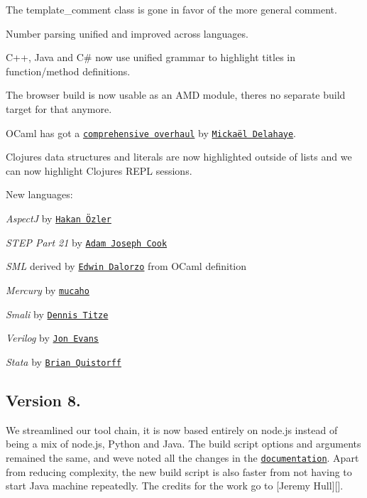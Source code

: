 \begin{DoxyItemize}
\item The {\ttfamily template\+\_\+comment} class is gone in favor of the more general {\ttfamily comment}.
\item Number parsing unified and improved across languages.
\item C++, Java and C\# now use unified grammar to highlight titles in function/method definitions.
\item The browser build is now usable as an A\+MD module, there\textquotesingle{}s no separate build target for that anymore.
\item O\+Caml has got a \href{https://github.com/isagalaev/highlight.js/pull/608#issue-46190207}{\tt comprehensive overhaul} by \href{https://github.com/polazarus}{\tt Mickaël Delahaye}.
\item Clojure\textquotesingle{}s data structures and literals are now highlighted outside of lists and we can now highlight Clojure\textquotesingle{}s R\+E\+PL sessions.
\end{DoxyItemize}

New languages\+:


\begin{DoxyItemize}
\item {\itshape AspectJ} by \href{https://github.com/ozlerhakan}{\tt Hakan Özler}
\item {\itshape S\+T\+EP Part 21} by \href{https://github.com/adamjcook}{\tt Adam Joseph Cook}
\item {\itshape S\+ML} derived by \href{https://github.com/edalorzo}{\tt Edwin Dalorzo} from O\+Caml definition
\item {\itshape Mercury} by \href{https://github.com/mucaho}{\tt mucaho}
\item {\itshape Smali} by \href{https://github.com/titze}{\tt Dennis Titze}
\item {\itshape Verilog} by \href{https://github.com/craftyjon}{\tt Jon Evans}
\item {\itshape Stata} by \href{https://github.com/bquistorff}{\tt Brian Quistorff}
\end{DoxyItemize}

\subsection*{Version 8.}

We streamlined our tool chain, it is now based entirely on node.\+js instead of being a mix of node.\+js, Python and Java. The build script options and arguments remained the same, and we\textquotesingle{}ve noted all the changes in the \href{http://highlightjs.readthedocs.org/en/latest/building-testing.html}{\tt documentation}. Apart from reducing complexity, the new build script is also faster from not having to start Java machine repeatedly. The credits for the work go to \mbox{[}Jeremy Hull\mbox{]}\mbox{[}\mbox{]}.

